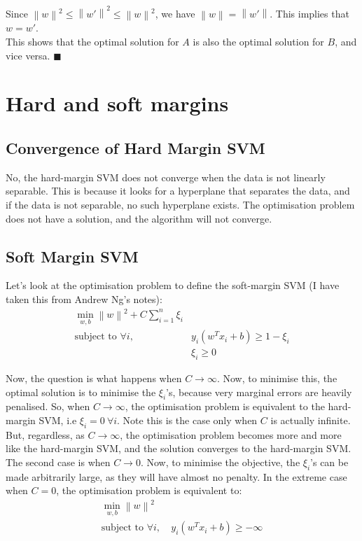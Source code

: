 \documentclass[a4paper]{article}
\newcommand{\norm}[1]{\left\lVert#1\right\rVert}
\begin{document}
Since $\norm{w}^2 \leq \norm{w'}^2 \leq \norm{w}^2$, we have $\norm{w} = \norm{w'}$. This implies that $w = w'$.\\

This shows that the optimal solution for $A$ is also the optimal solution for $B$, and vice versa. $\blacksquare$\\

\section{Hard and soft margins}

\subsection{Convergence of Hard Margin SVM}

No, the hard-margin SVM does not converge when the data is not linearly separable. This is because it looks for a hyperplane that separates the data, and if the data is not separable, no such hyperplane exists. The optimisation problem does not have a solution, and the algorithm will not converge.

\subsection{Soft Margin SVM}

Let's look at the optimisation problem to define the soft-margin SVM (I have taken this from Andrew Ng's notes):
\begin{align*}
    \min_{w, b} \norm{w}^2 + C \sum_{i=1}^n \xi_i&\\
    \text{subject to } \forall i, \ &y_i(w^T x_i + b) \geq 1 - \xi_i\\
    &\xi_i \geq 0
\end{align*}

Now, the question is what happens when $C \rightarrow \infty$. Now, to minimise this, the optimal solution is to minimise the $\xi_i$'s, because very marginal errors are heavily penalised. So, when $C \rightarrow \infty$, the optimisation problem is equivalent to the hard-margin SVM, i.e $\xi_i = 0\ \forall i$. Note this is the case only when $C$ is actually infinite. But, regardless, as $C \rightarrow \infty$, the optimisation problem becomes more and more like the hard-margin SVM, and the solution converges to the hard-margin SVM.\\

The second case is when $C \rightarrow 0$. Now, to minimise the objective, the $\xi_i$'s can be made arbitrarily large, as they will have almost no penalty. In the extreme case when $C = 0$, the optimisation problem is equivalent to:
\begin{align*}
    \min_{w, b} \norm{w}^2&\\
    \text{subject to } \forall i, \ &y_i(w^T x_i + b) \geq -\infty
\end{align*}
\end{document}
